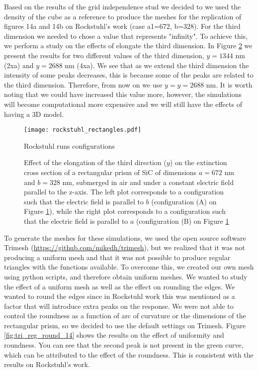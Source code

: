 Based on the results of the grid independence stud we decided to we used the density of the cube as a reference to 
produce the meshes for the replication of figures 14a and 14b on Rockstuhl's work (case a1=672, b=328). For the third 
dimension we needed to chose a value that represents "infinity". To achieve this, we perform a study on the effects of 
elongate the third dimension. In Figure \ref{fig:ext_y_14} we present the results for two different values of the 
third dimension, $y=1344$ nm (2xa) and $y=2688$ nm (4xa). 
We see that as we extend the third dimension the intensity of some peaks decreases, this is because some
of the peaks are related to the third dimension. Therefore, from now on we use $y=y=2688$ nm. It is worth 
noting that we could have increased this value more, however, the simulations will become computational
more expensive and we will still have the effects of having a 3D model.

\begin{figure}
    \centering
    \texttt{[image: rockstuhl\_rectangles.pdf]} 
    \caption{Rockstuhl runs configurations}
    \label{fig:rectangle_sketch}
\end{figure}

\begin{figure}
    \centering
    \caption{Effect of the elongation of the third direction ($y$) on the 
        extinction cross section of a rectangular prism of SiC of dimensions $a=672$ nm 
        and $b=328$ nm, submerged in air and under a constant electric field 
        parallel to the z-axis. The left plot corresponds to a configuration such that the electric 
        field is parallel to $b$ (configuration (A) on Figure \ref{fig:rectangle_sketch}), while the 
        right plot corresponds to a configuration such that the electric field is 
        parallel to $a$ (configuration (B) on Figure \ref{fig:rectangle_sketch}}
    \label{fig:ext_y_14}   
 \end{figure}


To generate the meshes for these simulations, we used the open source software Trimesh 
(\url{https://github.com/mikedh/trimesh}), but we realized that it was not producing a 
uniform mesh and that it was not possible to produce regular triangles with the functions 
available. To overcome this, we created our own mesh using python scripts, and therefore 
obtain uniform meshes. We wanted to study the effect of a uniform mesh as well as the effect
on rounding the edges. We wanted to round the edges since in Rockstuhl work this was mentioned 
as a factor that will introduce extra peaks on the response. We were not able to control the 
roundness as a function of arc of curvature or the dimensions of the rectangular prism, so we 
decided to use the default settings on Trimesh. Figure \ref{fig:tri_reg_round_14} shows the 
results on the effect of uniformity and roundness. You can see that the second peak is not
present in the green curve, which can be attributed to the effect of the roundness. This is 
consistent with the results on Rockstuhl's work. 

